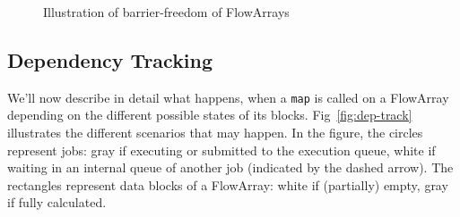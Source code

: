 \documentclass[runningheads,a4paper,fleqn]{llncs}
\begin{document}
\begin{figure}
  \caption{Illustration of barrier-freedom of FlowArrays}
  \label{fig:barrier-free}
\end{figure}

\subsection{Dependency Tracking}
We'll now describe in detail what happens, when a \texttt{map} is
called on a FlowArray depending on the different possible states of
its blocks. Fig~\ref{fig:dep-track} illustrates the different
scenarios that may happen. In the figure, the circles represent jobs:
gray if executing or submitted to the execution queue, white if
waiting in an internal queue of another job (indicated by the dashed
arrow). The rectangles represent data blocks of a FlowArray: white if
(partially) empty, gray if fully calculated.
\end{document}
